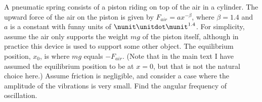  A pneumatic spring consists of a piston riding on top
of the air in a cylinder. The upward force of the air on
the piston is given by $F_{air}=ax^{-\beta}$, where $\beta=1.4$ and $a$ is a
constant with funny units of $\nunit\unitdot\munit^{1.4}$. For simplicity,
assume the air only supports the weight $mg$ of the
piston itself, although in practice this device is used to
support some other object. The equilibrium position, $x_0$,
is where $mg$ equals $-F_{air}$. (Note that in the main
text I have assumed the equilibrium position to be at $x=0$,
but that is not the natural choice here.) Assume friction
is negligible, and consider a case where the amplitude of
the vibrations is very small. Find the angular frequency of oscillation.\answercheck
